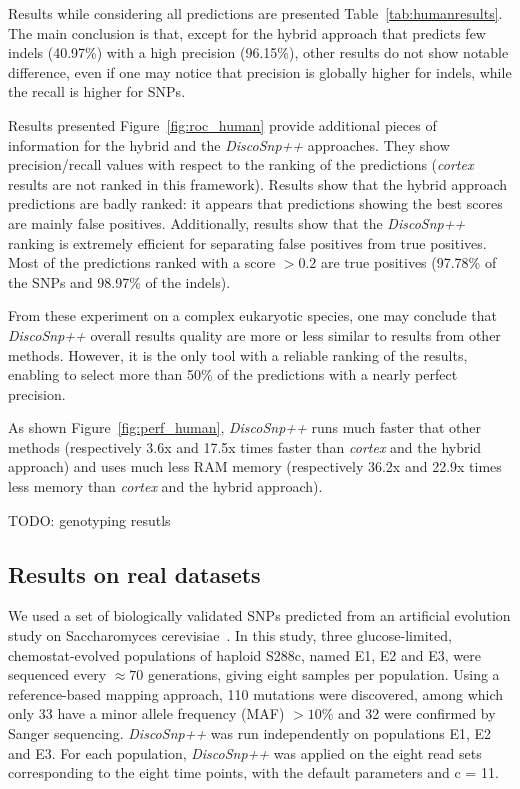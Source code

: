 \documentclass{bmcart}
\newcommand{\discopp}{{\it DiscoSnp++}\xspace}
\newcommand{\co}{{\it cortex}\xspace}
\begin{document}
Results while considering all predictions are presented Table~\ref{tab:humanresults}. 
The main conclusion is that, except for the hybrid approach that predicts few indels (40.97\%) with a high precision (96.15\%), other results do not show  notable difference, even if one may notice that precision is globally higher for indels, while the recall is higher for SNPs. 

Results presented Figure~\ref{fig:roc_human} provide additional pieces of information for the hybrid and the \discopp approaches. They show precision/recall values with respect to the ranking of the predictions (\co results are not ranked in this framework). Results show that the hybrid approach predictions are badly ranked: it appears that predictions showing the best scores are mainly false positives. Additionally, results show that the \discopp ranking is extremely efficient for separating false positives from true positives. Most of the predictions ranked with a score $>0.2$ are true positives (97.78\%  of the SNPs and 98.97\% of the indels). 

From these experiment on a complex eukaryotic species, one may conclude that \discopp overall results quality are more or less similar to results from other methods. However, it is the only tool with a reliable ranking of the results, enabling to select more than 50\% of the predictions with a nearly perfect precision.

As shown Figure~\ref{fig:perf_human}, \discopp runs much faster that other methods (respectively 3.6x and 17.5x times faster than \co and the hybrid approach) and uses much less RAM memory (respectively 36.2x and 22.9x times less memory than \co and the hybrid approach). 



TODO: genotyping resutls

\subsection*{Results on real datasets}
We used a set of biologically validated SNPs predicted from an artificial evolution study on Saccharomyces cerevisiae~\cite{Kvitek2013}. 
In this study, three glucose-limited, chemostat-evolved populations of haploid S288c, named
E1, E2 and E3, were sequenced every $\approx70$ generations, giving eight samples per population. Using a reference-based mapping approach, 110 mutations were discovered, among which only 33 have a minor allele frequency (MAF) $>10\%$ and 32 were confirmed by Sanger sequencing.  \discopp was run independently on populations E1, E2 and E3. For each population, \discopp was applied on the eight read sets corresponding to the eight time points, with the default parameters and c = 11. 
\end{document}
